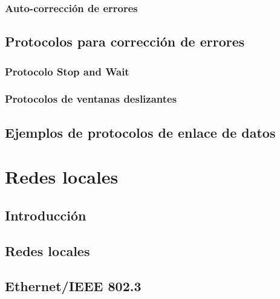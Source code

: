 \documentclass[
]{book}
\begin{document}
\hypertarget{auto-correcciuxf3n-de-errores}{%
\subsection{Auto-corrección de errores}\label{auto-correcciuxf3n-de-errores}}

\hypertarget{protocolos-para-correcciuxf3n-de-errores}{%
\section{Protocolos para corrección de errores}\label{protocolos-para-correcciuxf3n-de-errores}}

\hypertarget{protocolo-stop-and-wait}{%
\subsection{Protocolo Stop and Wait}\label{protocolo-stop-and-wait}}

\hypertarget{protocolos-de-ventanas-deslizantes}{%
\subsection{Protocolos de ventanas deslizantes}\label{protocolos-de-ventanas-deslizantes}}

\hypertarget{ejemplos-de-protocolos-de-enlace-de-datos}{%
\section{Ejemplos de protocolos de enlace de datos}\label{ejemplos-de-protocolos-de-enlace-de-datos}}

\hypertarget{redes-locales}{%
\chapter{Redes locales}\label{redes-locales}}

\hypertarget{introducciuxf3n-2}{%
\section{Introducción}\label{introducciuxf3n-2}}

\hypertarget{redes-locales-1}{%
\section{Redes locales}\label{redes-locales-1}}

\hypertarget{ethernetieee-802.3}{%
\section{Ethernet/IEEE 802.3}\label{ethernetieee-802.3}}
\end{document}

